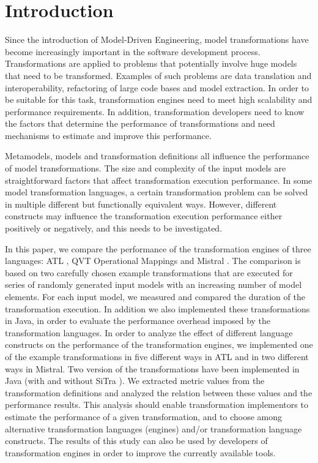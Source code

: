 \documentclass[12pt]{elsarticle}
\begin{document}
\section{Introduction}

Since the introduction of Model-Driven Engineering, model transformations have
become increasingly important in the software development process.
Transformations are applied to problems that potentially involve huge models
that need to be transformed. Examples of such problems are data translation and
interoperability, refactoring of large code bases and model extraction.
In order to be suitable for this task, transformation engines need to meet high
scalability and performance requirements. In addition, transformation
developers need to know the factors that determine the performance of
transformations and need mechanisms to estimate and improve this performance.

Metamodels, models and transformation definitions all influence the
performance of model transformations. The size and complexity of
the input models are straightforward factors that affect transformation execution performance.
In some model transformation languages, a certain transformation problem can be solved
in multiple different but functionally equivalent ways. However, different
constructs may influence the transformation execution performance either positively
or negatively, and this needs to be investigated.

In this paper, we compare the performance of the transformation engines of three
languages: ATL \cite{jouault06}, QVT Operational Mappings \cite{qvt_spec} and
Mistral \cite{KurtevB04}. The comparison is based on two carefully chosen
example transformations that are executed for series of randomly generated input
models with an increasing number of model elements. For each input model, we
measured and compared the duration of the transformation execution. In addition
we also implemented these transformations in Java, in order to evaluate the
performance overhead imposed by the transformation languages. In order to
analyze the effect of different language constructs on the performance of the
transformation engines, we implemented one of the example transformations in
five different ways in ATL and in two different ways in Mistral. Two version of the
transformations have been implemented in Java (with and without SiTra
\cite{akehurst2006}). We extracted metric values from the transformation definitions and
analyzed the relation between these values and the performance results. This analysis should
enable transformation implementors to estimate the performance of a given
transformation, and to choose among alternative transformation languages (engines) and/or
transformation language constructs. The results of this study can also be used
by developers of transformation engines in order to improve the currently
available tools.
\end{document}

